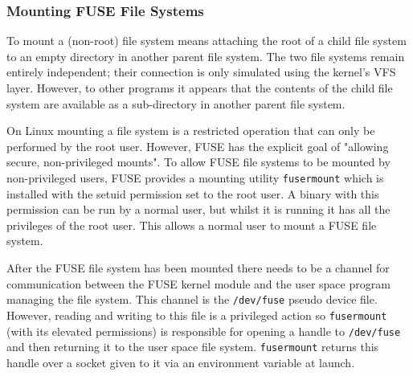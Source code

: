 
\subsubsection{Mounting FUSE File Systems}
\label{mounting-fuse-fs}

To mount a (non-root) file system means attaching the root of a child file
system to an empty directory in another parent file system. The two file
systems remain entirely independent; their connection is only simulated using
the kernel's VFS layer. However, to other programs it appears that the contents
of the child file system are available as a sub-directory in another parent
file system.

On Linux mounting a file system is a restricted operation that can only be
performed by the root user\cite{mount}. However, FUSE has the explicit goal of
"allowing secure, non-privileged mounts"\cite{kernel-fuse}. To allow FUSE file
systems to be mounted by non-privileged users, FUSE provides a mounting utility
\texttt{fusermount} which is installed with the setuid\cite{setuid} permission
set to the root user. A binary with this permission can be run by a normal
user, but whilst it is running it has all the privileges of the root user. This
allows a normal user to mount a FUSE file system.

After the FUSE file system has been mounted there needs to be a channel for
communication between the FUSE kernel module and the user space program
managing the file system. This channel is the \texttt{/dev/fuse} pseudo device
file. However, reading and writing to this file is a privileged action so
\texttt{fusermount} (with its elevated permissions) is responsible for opening
a handle to \texttt{/dev/fuse} and then returning it to the user space file
system. \texttt{fusermount} returns this handle over a socket given to it via
an environment variable at launch.

